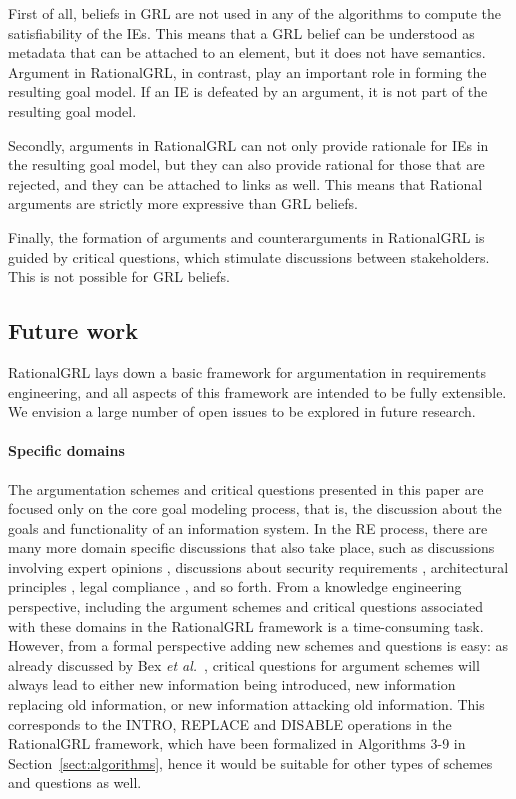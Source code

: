 First of all, beliefs in GRL are not used in any of the algorithms to compute the satisfiability of the IEs. This means that a GRL belief can be understood as metadata that can be attached to an element, but it does not have semantics. Argument in RationalGRL, in contrast, play an important role in forming the resulting goal model. If an IE is defeated by an argument, it is not part of the resulting goal model. 

Secondly, arguments in RationalGRL can not only provide rationale for IEs in the resulting goal model, but they can also provide rational for those that are rejected, and they can be attached to links as well. This means that Rational arguments are strictly more expressive than GRL beliefs.

Finally, the formation of arguments and counterarguments in RationalGRL is guided by critical questions, which stimulate discussions between stakeholders. This is not possible for GRL beliefs.

\subsection{Future work}
\label{sect:discussion:futurework}

RationalGRL lays down a basic framework for argumentation in requirements engineering, and all aspects of this framework are intended to be fully extensible. We envision a large number of open issues to be explored in future research.

\paragraph{Specific domains}
The argumentation schemes and critical questions presented in this paper are focused only on the core goal modeling process, that is, the discussion about the goals and functionality of an information system. In the RE process, there are many more domain specific discussions that also take place, such as discussions involving expert opinions \cite{murukannaiah2015}, discussions about security requirements \cite{haley2008security,yu2015automated,ionita2014argumentation}, architectural principles \cite{marosin-etal:caise2016}, legal compliance \cite{Ghanavati2013}, and so forth. From a knowledge engineering perspective, including the argument schemes and critical questions associated with these domains in the RationalGRL framework is a time-consuming task. However, from a formal perspective adding new schemes and questions is easy: as already discussed by Bex \emph{et al.}~\cite{bexEtal2003}, critical questions for argument schemes will always lead to either new information being introduced, new information replacing old information, or new information attacking old information. This corresponds to the \textsf{INTRO}, \textsf{REPLACE} and \textsf{DISABLE} operations in the RationalGRL framework, which have been formalized in Algorithms 3-9 in Section~\ref{sect:algorithms}, hence it would be suitable for other types of schemes and questions as well.

